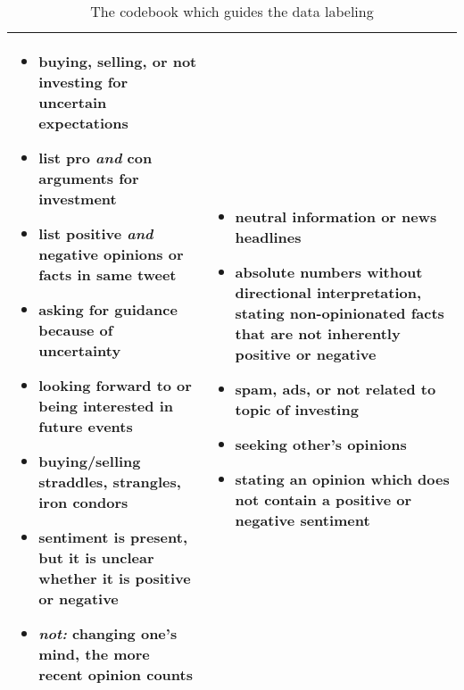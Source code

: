 \begin{table}[!ht]
\begin{tabular}{p{7.5cm}p{7.5cm}}
\begin{itemize}[noitemsep,leftmargin=*,topsep=-12pt]
	\item buying, selling, or not investing for uncertain expectations
	\item list pro \emph{and} con arguments for investment
	\item list positive \emph{and} negative opinions or facts in same tweet
	\item asking for guidance because of uncertainty
	\item looking forward to or being interested in future events
	\item buying/selling straddles, strangles, iron condors
	\item sentiment is present, but it is unclear whether it is positive or negative
	\item \emph{not:} changing one's mind, the more recent opinion counts

\end{itemize} & \begin{itemize}[noitemsep,leftmargin=*,topsep=-12pt]
	\item neutral information or news headlines
	\item absolute numbers without directional interpretation, stating non-opinionated facts that are not inherently positive or negative
	\item spam, ads, or not related to topic of investing
	\item seeking other's opinions
	\item stating an opinion which does not contain a positive or negative sentiment
\end{itemize}\\

\bottomrule
\end{tabular}
\caption{The codebook which guides the data labeling}
\label{table-codebook}
\end{table}